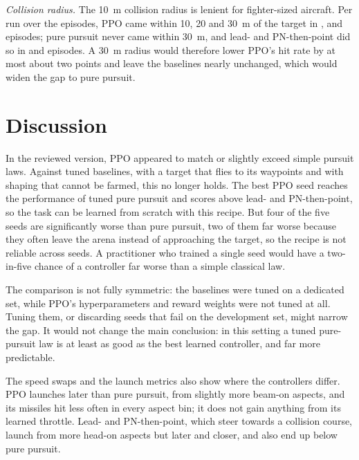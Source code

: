 \documentclass[conference]{IEEEtran}
\begin{document}
\emph{Collision radius.} The 10~m collision radius is lenient for fighter-sized aircraft. Per run over the \REpisodesPerRun{} episodes, PPO came within 10, 20 and 30~m of the target in \RPpoCloseTen, \RPpoCloseTwenty{} and \RPpoCloseThirty{} episodes; pure pursuit never came within 30~m, and lead- and PN-then-point did so in \RLeadCloseThirty{} and \RPnCloseThirty{} episodes. A 30~m radius would therefore lower PPO's hit rate by at most about two points and leave the baselines nearly unchanged, which would widen the gap to pure pursuit.

\section{Discussion}\label{sec:discussion}
In the reviewed version, PPO appeared to match or slightly exceed simple pursuit laws. Against tuned baselines, with a target that flies to its waypoints and with shaping that cannot be farmed, this no longer holds. The best PPO seed reaches the performance of tuned pure pursuit and scores above lead- and PN-then-point, so the task can be learned from scratch with this recipe. But four of the five seeds are significantly worse than pure pursuit, two of them far worse because they often leave the arena instead of approaching the target, so the recipe is not reliable across seeds. A practitioner who trained a single seed would have a two-in-five chance of a controller far worse than a simple classical law.

The comparison is not fully symmetric: the baselines were tuned on a dedicated set, while PPO's hyperparameters and reward weights were not tuned at all. Tuning them, or discarding seeds that fail on the development set, might narrow the gap. It would not change the main conclusion: in this setting a tuned pure-pursuit law is at least as good as the best learned controller, and far more predictable.

The speed swaps and the launch metrics also show where the controllers differ. PPO launches later than pure pursuit, from slightly more beam-on aspects, and its missiles hit less often in every aspect bin; it does not gain anything from its learned throttle. Lead- and PN-then-point, which steer towards a collision course, launch from more head-on aspects but later and closer, and also end up below pure pursuit.

\end{document}
